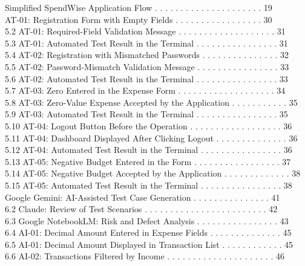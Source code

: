 \documentclass[12pt,a4paper]{report}
\begin{document}
   Simplified SpendWise Application Flow . . . . . . . . . . . . . . . . . . . . .    19\\ 

 AT-01: Registration Form with Empty Fields . . . . . . . . . . . . . . . . .         30\\ 
5.2 AT-01: Required-Field Validation Message . . . . . . . . . . . . . . . . . . .       31\\ 
5.3 AT-01: Automated Test Result in the Terminal . . . . . . . . . . . . . . . .         31\\ 
5.4 AT-02: Registration with Mismatched Passwords . . . . . . . . . . . . . . .          32\\ 
5.5 AT-02: Password-Mismatch Validation Message . . . . . . . . . . . . . . . .          33\\ 
5.6 AT-02: Automated Test Result in the Terminal . . . . . . . . . . . . . . . .         33\\ 
5.7 AT-03: Zero Entered in the Expense Form . . . . . . . . . . . . . . . . . . .        34\\ 
5.8 AT-03: Zero-Value Expense Accepted by the Application . . . . . . . . . . .          35\\ 
5.9 AT-03: Automated Test Result in the Terminal . . . . . . . . . . . . . . . .         35\\ 
5.10 AT-04: Logout Button Before the Operation . . . . . . . . . . . . . . . . . .       36\\ 
5.11 AT-04: Dashboard Displayed After Clicking Logout . . . . . . . . . . . . . .        36\\ 
5.12 AT-04: Automated Test Result in the Terminal . . . . . . . . . . . . . . . .        36\\ 
5.13 AT-05: Negative Budget Entered in the Form . . . . . . . . . . . . . . . . .        37\\ 
5.14 AT-05: Negative Budget Accepted by the Application . . . . . . . . . . . . .        38\\ 
5.15 AT-05: Automated Test Result in the Terminal . . . . . . . . . . . . . . . .        38\\ 

   Google Gemini: AI-Assisted Test Case Generation . . . . . . . . . . . . . . .      41\\ 
6.2   Claude: Review of Test Scenarios . . . . . . . . . . . . . . . . . . . . . . . .   42\\ 
6.3   Google NotebookLM: Risk and Defect Analysis . . . . . . . . . . . . . . . .        43\\ 
6.4   AI-01: Decimal Amount Entered in Expense Fields . . . . . . . . . . . . . .        45\\ 
6.5   AI-01: Decimal Amount Displayed in Transaction List . . . . . . . . . . . .        45\\ 
6.6   AI-02: Transactions Filtered by Income . . . . . . . . . . . . . . . . . . . . .   46\\ 
\end{document}
